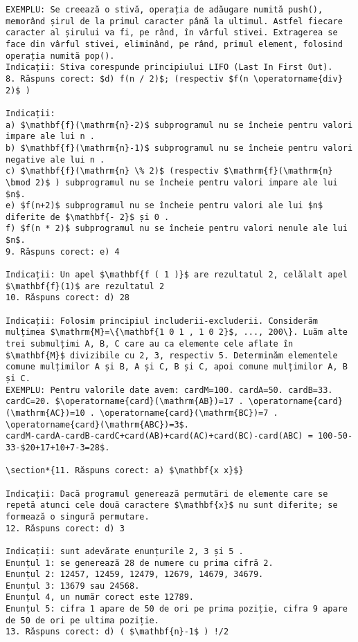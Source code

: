 \begin{verbatim}
EXEMPLU: Se creează o stivă, operația de adăugare numită push(), memorând șirul de la primul caracter până la ultimul. Astfel fiecare caracter al șirului va fi, pe rând, în vârful stivei. Extragerea se face din vârful stivei, eliminând, pe rând, primul element, folosind operația numită pop().
Indicații: Stiva corespunde principiului LIFO (Last In First Out).
8. Răspuns corect: $d) f(n / 2)$; (respectiv $f(n \operatorname{div} 2)$ )

Indicații:
a) $\mathbf{f}(\mathrm{n}-2)$ subprogramul nu se încheie pentru valori impare ale lui n .
b) $\mathbf{f}(\mathrm{n}-1)$ subprogramul nu se încheie pentru valori negative ale lui n .
c) $\mathbf{f}(\mathrm{n} \% 2)$ (respectiv $\mathrm{f}(\mathrm{n} \bmod 2)$ ) subprogramul nu se încheie pentru valori impare ale lui $n$.
e) $f(n+2)$ subprogramul nu se încheie pentru valori ale lui $n$ diferite de $\mathbf{- 2}$ și 0 .
f) $f(n * 2)$ subprogramul nu se încheie pentru valori nenule ale lui $n$.
9. Răspuns corect: e) 4

Indicații: Un apel $\mathbf{f ( 1 )}$ are rezultatul 2, celălalt apel $\mathbf{f}(1)$ are rezultatul 2
10. Răspuns corect: d) 28

Indicații: Folosim principiul includerii-excluderii. Considerăm mulțimea $\mathrm{M}=\{\mathbf{1 0 1 , 1 0 2}$, ..., 200\}. Luăm alte trei submulțimi A, B, C care au ca elemente cele aflate în $\mathbf{M}$ divizibile cu 2, 3, respectiv 5. Determinăm elementele comune mulțimilor A și B, A și C, B și C, apoi comune mulțimilor A, B și C.
EXEMPLU: Pentru valorile date avem: cardM=100. cardA=50. cardB=33. cardC=20. $\operatorname{card}(\mathrm{AB})=17 . \operatorname{card}(\mathrm{AC})=10 . \operatorname{card}(\mathrm{BC})=7 . \operatorname{card}(\mathrm{ABC})=3$.
cardM-cardA-cardB-cardC+card(AB)+card(AC)+card(BC)-card(ABC) = 100-50-33-$20+17+10+7-3=28$.

\section*{11. Răspuns corect: a) $\mathbf{x x}$}

Indicații: Dacă programul generează permutări de elemente care se repetă atunci cele două caractere $\mathbf{x}$ nu sunt diferite; se formează o singură permutare.
12. Răspuns corect: d) 3

Indicații: sunt adevărate enunțurile 2, 3 și 5 .
Enunțul 1: se generează 28 de numere cu prima cifră 2.
Enunțul 2: 12457, 12459, 12479, 12679, 14679, 34679.
Enunțul 3: 13679 sau 24568.
Enunțul 4, un număr corect este 12789.
Enunțul 5: cifra 1 apare de 50 de ori pe prima poziție, cifra 9 apare de 50 de ori pe ultima poziție.
13. Răspuns corect: d) ( $\mathbf{n}-1$ ) !/2


\end{verbatim}
